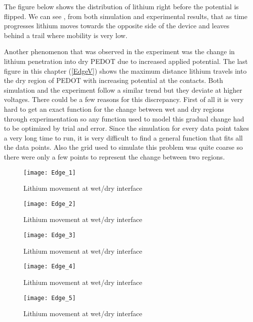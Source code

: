 The figure below shows the distribution of lithium right before the potential is flipped. We can see , from both simulation and experimental results, that as time progresses lithium moves towards the opposite side of the device and leaves behind a trail where mobility is very low. 

Another phenomenon that was observed in the experiment was the change in lithium penetration into dry PEDOT due to increased applied potential. The last figure in this chapter (\ref{EdgeV}) shows the maximum distance lithium travels into the dry region of PEDOT with increasing potential at the contacts. Both simulation and the experiment follow a similar trend but they deviate at higher voltages. There could be a few reasons for this discrepancy. First of all it is very hard to get an exact function for the change between wet and dry regions through experimentation so any function used to model this gradual change had to be optimized by trial and error. Since the simulation for every data point takes a very long time to run, it is very difficult to find a general function that fits all the data points. Also the grid used to simulate this problem was quite coarse so there were only a few points to represent the change between two regions.

\begin{figure}[!htp]
\centering
\texttt{[image: Edge\_1]}
\caption{Lithium movement at wet/dry interface} 
\label{Edge_1}
\end{figure}

\begin{figure}[!htp]
\centering
\texttt{[image: Edge\_2]}
\caption{Lithium movement at wet/dry interface} 
\label{Edge_2}
\end{figure}

\begin{figure}[!htp]
\centering
\texttt{[image: Edge\_3]}
\caption{Lithium movement at wet/dry interface} 
\label{Edge_3}
\end{figure}


\begin{figure}[!htp]
\centering
\texttt{[image: Edge\_4]}
\caption{Lithium movement at wet/dry interface} 
\label{Edge_4}
\end{figure}

\begin{figure}[!htp]
\centering
\texttt{[image: Edge\_5]}
\caption{Lithium movement at wet/dry interface} 
\label{Edge_5}
\end{figure}


